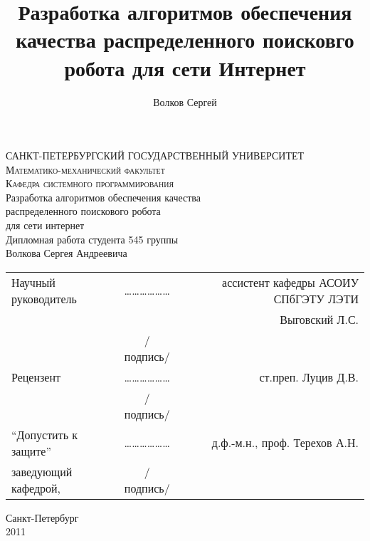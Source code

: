 \documentclass[a4paper,10pt]{report}
\title{Разработка алгоритмов обеспечения качества распределенного поисковго робота для сети Интернет}
\author{Волков Сергей}
\begin{document}
\begin{titlepage}
\begin{center}

\textsc{САНКТ-ПЕТЕРБУРГСКИЙ ГОСУДАРСТВЕННЫЙ УНИВЕРСИТЕТ}\\
\textsc{Математико-механический факультет}\\[1.0cm]

\textsc{Кафедра системного программирования}\\[3.0cm]

{ \LARGE Разработка алгоритмов обеспечения качества}\\[1.0cm]
{ \LARGE распределенного поискового робота}\\[1.0cm]
{ \LARGE для сети интернет}\\[1.0cm]
{Дипломная работа студента 545 группы \\ Волкова Сергея Андреевича}\\[3.0cm]

\begin{tabular}{lcr}
Научный руководитель & ……………… & ассистент кафедры АСОИУ СПбГЭТУ ЛЭТИ\\ & & Выговский Л.С. \\
& /подпись/ & \\[1.0cm]
Рецензент            & ……………… & ст.преп. Луцив Д.В. \\
& /подпись/ & \\[1.0cm]
``Допустить к защите'' & ……………… & д.ф.-м.н., проф. Терехов А.Н. \\
заведующий кафедрой, & /подпись/ & \\
\end{tabular}

\vfill

{\large Санкт-Петербург \\ 2011}

\end{center}
\end{titlepage}
\end{document}
